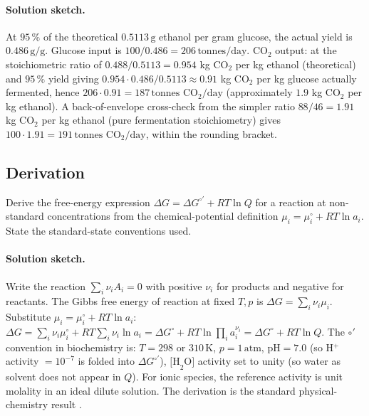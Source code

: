 \paragraph{Solution sketch.}
At $95\,\%$ of the theoretical $0.5113\,\text{g}$ ethanol per gram
glucose, the actual yield is $0.486\,\text{g}/\text{g}$. Glucose input
is $100/0.486 = 206\,\text{tonnes}/\text{day}$. CO$_2$ output: at the
stoichiometric ratio of $0.488/0.5113 = 0.954$ kg CO$_2$ per kg
ethanol (theoretical) and $95\,\%$ yield giving $0.954 \cdot 0.486 /
0.5113 \approx 0.91$ kg CO$_2$ per kg glucose actually fermented,
hence $206 \cdot 0.91 = 187\,\text{tonnes CO}_2/\text{day}$
(approximately $1.9$ kg CO$_2$ per kg ethanol). A back-of-envelope
cross-check from the simpler ratio $88/46 = 1.91$ kg CO$_2$ per kg
ethanol (pure fermentation stoichiometry) gives $100 \cdot 1.91 =
191\,\text{tonnes CO}_2/\text{day}$, within the rounding bracket.

\subsection*{Derivation}

\begin{exercise}
Derive the free-energy expression
$\Delta G = \Delta G^{\circ\prime} + RT \ln Q$ for a reaction at
non-standard concentrations from the chemical-potential definition
$\mu_i = \mu_i^\circ + RT \ln a_i$. State the standard-state
conventions used.
\end{exercise}

\paragraph{Solution sketch.}
Write the reaction $\sum_i \nu_i A_i = 0$ with positive $\nu_i$ for
products and negative for reactants. The Gibbs free energy of
reaction at fixed $T, p$ is $\Delta G = \sum_i \nu_i \mu_i$. Substitute
$\mu_i = \mu_i^\circ + RT \ln a_i$: $\Delta G = \sum_i \nu_i \mu_i^\circ
+ RT \sum_i \nu_i \ln a_i = \Delta G^\circ + RT \ln \prod_i a_i^{\nu_i}
= \Delta G^\circ + RT \ln Q$. The $\circ\prime$ convention in
biochemistry is: $T = 298$ or $310\,\text{K}$, $p = 1\,\text{atm}$,
$\text{pH} = 7.0$ (so H$^+$ activity $= 10^{-7}$ is folded into
$\Delta G^{\circ\prime}$), $\text{[H}_2\text{O]}$ activity set to
unity (so water as solvent does not appear in $Q$). For ionic species,
the reference activity is unit molality in an ideal dilute solution.
The derivation is the standard physical-chemistry result
\cite[ch.~3]{text:v6c02-atkins-physical-chem-2018}.

